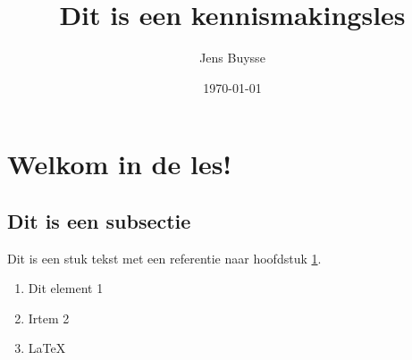 \documentclass[11pt,twoside,a4paper,threecolumn]{article}
\author{Jens Buysse}
\title{Dit is een kennismakingsles}
\date{\today}
\begin{document}
	\maketitle
	\section{Welkom in de les!}
	\label{sec:welkom}
	\blindtext[1]
	
	
	
	\subsection{Dit is een subsectie}
		\blindtext[1]
		
		Dit is een stuk tekst met een referentie naar hoofdstuk  \ref{sec:welkom}.
		
		\begin{enumerate}
			\item Dit element 1
			\item Irtem 2
			\item \LaTeX
		\end{enumerate}
	
	
\end{document}
